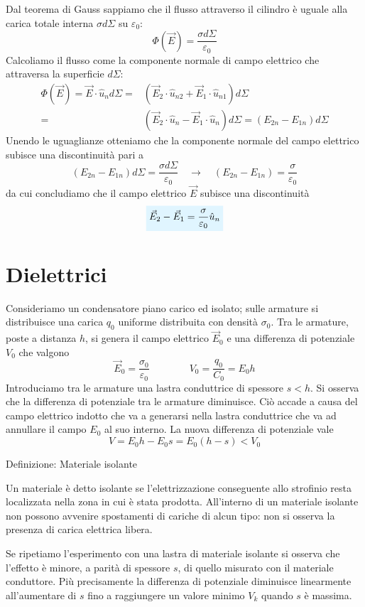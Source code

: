 \documentclass[x11names]{report}
\newcommand{\definizione}[2]{
	\begin{center}
		\fboxsep11pt
		\colorbox{myblue}{\begin{minipage}{5.75in}
				\begin{blues}{Definizione: #1}
					#2
				\end{blues}
		\end{minipage}}
	\end{center}
}
\newcommand{\viola}[1]{%
	\colorbox{myblue}{$\displaystyle #1$}
}
\begin{document}
Dal teorema di Gauss sappiamo che il flusso attraverso il cilindro è uguale alla carica totale interna
\(\sigma d\Sigma\) su \(\varepsilon_0\):
\[
\Phi(\vec{E}) = \frac{\sigma d\Sigma}{\varepsilon_0}
\]
Calcoliamo il flusso come la componente normale di campo elettrico che attraversa la superficie \(d\Sigma\):
\begin{align*}
	\Phi(\vec{E}) = \vec{E}\cdot \hat{u}_n  d\Sigma =& \left(\vec{E}_2\cdot\hat{u}_{n2} + \vec{E}_1\cdot\hat{u}_{n1} \right) d\Sigma\\ =& \left(\vec{E}_2\cdot\hat{u}_{n} - \vec{E}_1\cdot\hat{u}_{n} \right) d\Sigma = \left(E_{2n} - E_{1n}\right)d\Sigma
\end{align*}
Unendo le uguaglianze otteniamo che la componente normale del campo elettrico subisce una discontinuità pari a 
\[
\left(E_{2n} - E_{1n}\right)d\Sigma = \frac{\sigma d\Sigma}{\varepsilon_0} \quad \to \quad \left(E_{2n} - E_{1n}\right) = \frac{\sigma}{\varepsilon_0}
\]
da cui concludiamo che il campo elettrico \(\vec{E}\) subisce una discontinuità 
\begin{equation}
 	\viola{\vec{E}_{2} - \vec{E}_{1} = \frac{\sigma}{\varepsilon_0}\hat{u}_n}
\end{equation}


\section{Dielettrici}
Consideriamo un condensatore piano carico ed isolato; sulle armature si distribuisce una carica \(q_0\) uniforme distribuita con densità \(\sigma_0\). Tra le armature, poste a distanza \(h\), si genera il campo elettrico \(\vec{E}_0\) e una differenza di potenziale \(V_0\) che valgono
\[
\vec{E}_0 = \frac{\sigma_0}{\varepsilon_0} \qquad\qquad V_0 = \frac{q_0}{C_0} = E_0 h
\]
Introduciamo tra le armature una lastra conduttrice di spessore \(s < h\). Si osserva che la differenza di potenziale tra le armature diminuisce. Ciò accade a causa del campo elettrico indotto che va a generarsi nella lastra conduttrice che va ad annullare il campo \(E_0\) al suo interno. La nuova differenza di potenziale vale
\[
V = E_0h - E_0 s = E_0(h-s) < V_0
\]
\definizione{Materiale isolante}{
Un materiale è detto isolante se l'elettrizzazione conseguente allo strofinio resta localizzata nella zona in cui è stata prodotta. All'interno di un materiale isolante non possono avvenire spostamenti di cariche di alcun tipo: non si osserva la presenza di carica elettrica libera.
}
Se ripetiamo l'esperimento con una lastra di materiale isolante si osserva che l'effetto è minore, a parità di spessore \(s\), di quello misurato con il materiale conduttore. Più precisamente la differenza di potenziale diminuisce linearmente all'aumentare di \(s\) fino a raggiungere un valore minimo \(V_k\) quando \(s\) è massima.
\end{document}
